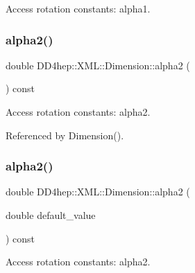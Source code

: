 Access rotation constants\+: alpha1. 

\hypertarget{struct_d_d4hep_1_1_x_m_l_1_1_dimension_a55531506942a11ff2691e7d89dc8d94e}{}\label{struct_d_d4hep_1_1_x_m_l_1_1_dimension_a55531506942a11ff2691e7d89dc8d94e} 
\subsubsection{\texorpdfstring{alpha2()}{alpha2()}\hspace{0.1cm}{\footnotesize\ttfamily [1/2]}}
{\footnotesize\ttfamily double D\+D4hep\+::\+X\+M\+L\+::\+Dimension\+::alpha2 (\begin{DoxyParamCaption}{ }\end{DoxyParamCaption}) const}



Access rotation constants\+: alpha2. 



Referenced by Dimension().

\hypertarget{struct_d_d4hep_1_1_x_m_l_1_1_dimension_ae93e218271e075f343081e31f857ed55}{}\label{struct_d_d4hep_1_1_x_m_l_1_1_dimension_ae93e218271e075f343081e31f857ed55} 
\subsubsection{\texorpdfstring{alpha2()}{alpha2()}\hspace{0.1cm}{\footnotesize\ttfamily [2/2]}}
{\footnotesize\ttfamily double D\+D4hep\+::\+X\+M\+L\+::\+Dimension\+::alpha2 (\begin{DoxyParamCaption}\item[{double}]{default\+\_\+value }\end{DoxyParamCaption}) const}



Access rotation constants\+: alpha2. 

\hypertarget{struct_d_d4hep_1_1_x_m_l_1_1_dimension_a92e6af995d164dad00e6fbd087b28d1c}{}\label{struct_d_d4hep_1_1_x_m_l_1_1_dimension_a92e6af995d164dad00e6fbd087b28d1c} 
